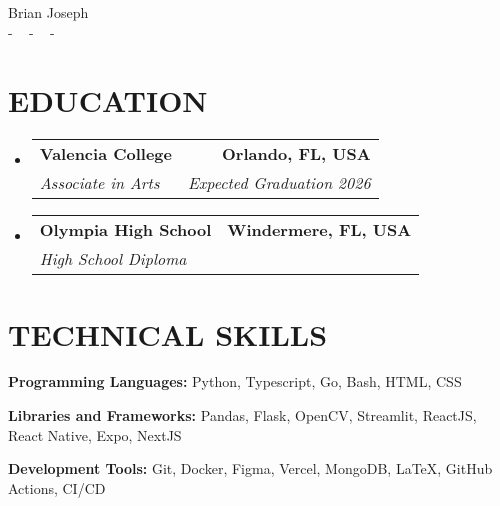 \documentclass[letterpaper,11pt]{article}
\makeatletter
\newcommand{\resumeSubheading}[4]{
  \vspace{-2pt}\item
    \begin{tabular*}{1.0\textwidth}[t]{l@{\extracolsep{\fill}}r}
      \textbf{\large#1} & \textbf{\small #2} \\
      \textit{\large#3} & \textit{\small #4} \\
      
    \end{tabular*}\vspace{-7pt}
}
\newcommand{\resumeSubHeadingListStart}{\begin{itemize}[leftmargin=0.0in, label={}]}
\newcommand{\resumeSubHeadingListEnd}{\end{itemize}}
\makeatother
\begin{document}


\begin{center}
    {\huge Brian Joseph} \\ \vspace{2pt} 
    \small{-}
    \href{mailto:brianjoseph1758@gmail.com}{\color{blue}{brian@brianjoseph.me}} ~ 
    \small{-}
    \href{https://linkedin.com/in/brianjoseph1758}{ \color{blue}{linkedin.com/in/brianjoseph1758}}  ~
    \small{-}
    \href{https://github.com/lonesume}{ \color{blue}{github.com/lonesume}} ~
    \vspace{-7pt}
\end{center}

\section{\color{airforceblue}EDUCATION}
  \resumeSubHeadingListStart
    \resumeSubheading
      {Valencia College}{Orlando, FL, USA}
      {Associate in Arts}{Expected Graduation 2026}
    \vspace{-4pt}
     \resumeSubheading
      {Olympia High School}{Windermere, FL, USA}
      {High School Diploma}{}
  \resumeSubHeadingListEnd
  \vspace{-10pt}

\section{\color{airforceblue}TECHNICAL SKILLS}
 \begin{itemize}[leftmargin=0in, label={}]
    \small{\item{
     \textbf{\normalsize{Programming Languages:}}{ \normalsize{Python, Typescript, Go, Bash, HTML, CSS}} \\
      \vspace{1.2pt}
      
     \textbf{\normalsize{Libraries and Frameworks:}}{ \normalsize{Pandas, Flask, OpenCV, Streamlit, ReactJS, React Native, Expo, NextJS }} \\
      \vspace{1.2pt}
      
     \textbf{\normalsize{Development Tools:}}{ \normalsize{Git, Docker, Figma, Vercel, MongoDB, LaTeX, GitHub Actions, CI/CD }}


     }}
 \end{itemize}
 \vspace{-16pt}
\end{document}

